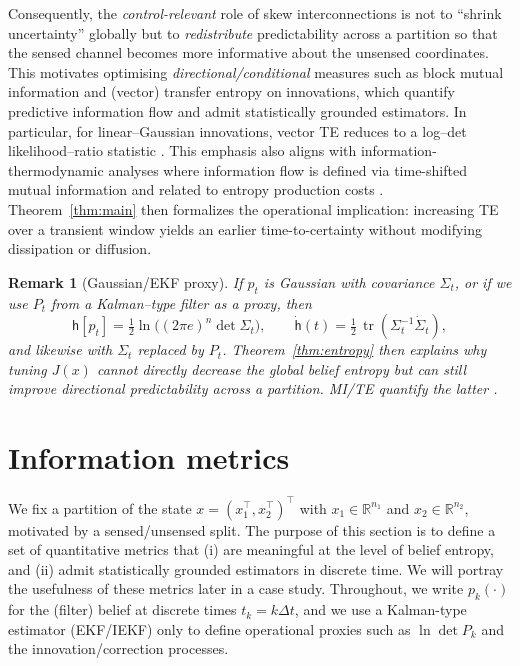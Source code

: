 \documentclass[final,5p,times,twocolumn]{elsarticle}
\newtheorem{remark}{Remark}
\DeclareMathOperator{\tr}{tr}
\begin{document}
	Consequently, the \emph{control-relevant} role of skew interconnections is not to ``shrink uncertainty'' globally but to \emph{redistribute} predictability across a partition so that the sensed channel becomes more informative about the unsensed coordinates. This motivates optimising \emph{directional/conditional} measures such as block mutual information and (vector) transfer entropy on innovations, which quantify predictive information flow and admit statistically grounded estimators. In particular, for linear--Gaussian innovations, vector TE reduces to a log--det likelihood--ratio statistic \citep{Barnett2009_PRL}. This emphasis also aligns with information-thermodynamic analyses where information flow is defined via time-shifted mutual information and related to entropy production costs \citep{Allahverdyan2009_JSTAT}. Theorem~\ref{thm:main} then formalizes the operational implication: increasing TE over a transient window yields an earlier time-to-certainty without modifying dissipation or diffusion.
	
	\begin{remark}[Gaussian/EKF proxy]
	If \(p_t\) is Gaussian with covariance \(\Sigma_t\), or if we use \(P_t\) from a Kalman--type filter as a proxy, then
	\[
	\mathsf h[p_t]=\tfrac12\ln\!\big((2\pi e)^n\det \Sigma_t\big),\qquad 
	\dot{\mathsf h}(t)=\tfrac12\,\tr(\Sigma_t^{-1}\dot\Sigma_t),
	\]
	and likewise with \(\Sigma_t\) replaced by \(P_t\). Theorem~\ref{thm:entropy} then explains why tuning \(J(x)\) cannot \emph{directly} decrease the global belief entropy but can still improve \emph{directional} predictability across a partition. MI/TE quantify the latter \citep{Allahverdyan2009_JSTAT}.
\end{remark}

\section{Information metrics}
\label{sec:info-metrics}

We fix a partition of the state $x=(x_1^\top,x_2^\top)^\top$ with $x_1\in\mathbb{R}^{n_1}$ and $x_2\in\mathbb{R}^{n_2}$, motivated by a sensed/unsensed split. The purpose of this section is to define a set of quantitative metrics that (i) are meaningful at the level of belief entropy, and (ii) admit statistically grounded estimators in discrete time. We will portray the usefulness of these metrics later in a case study. Throughout, we write $p_k(\cdot)$ for the (filter) belief at discrete times $t_k=k\Delta t$, and we use a Kalman-type estimator (EKF/IEKF) only to define operational proxies such as $\ln\det P_k$ and the innovation/correction processes.
\end{document}
